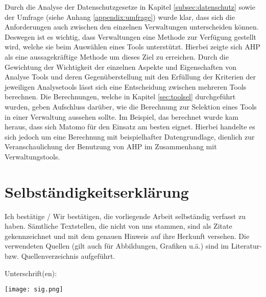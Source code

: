 Durch die Analyse der Datenschutzgesetze in Kapitel \ref{subsec:datenschutz} sowie der Umfrage (siehe Anhang \ref{appendix:umfrage}) wurde klar, dass sich die Anforderungen auch zwischen den einzelnen Verwaltungen unterscheiden können. Deswegen ist es wichtig, dass Verwaltungen eine Methode zur Verfügung gestellt wird, welche sie beim Auswählen eines Tools unterstützt. Hierbei zeigte sich AHP als eine aussagekräftige Methode um dieses Ziel zu erreichen. Durch die Gewichtung der Wichtigkeit der einzelnen Aspekte und Eigenschaften von Analyse Tools und deren Gegenüberstellung mit den Erfüllung der Kriterien der jeweiligen Analysetools lässt sich eine Entscheidung zwischen mehreren Tools berechnen. Die Berechnungen, welche in Kapitel \ref{sec:toolsel} durchgeführt wurden, geben Aufschluss darüber, wie die Berechnung zur Selektion eines Tools in einer Verwaltung aussehen sollte. Im Beispiel, das berechnet wurde kam heraus, dass sich Matomo für den Einsatz am besten eignet. Hierbei handelte es sich jedoch um eine Berechnung mit beispielhafter Datengrundlage, dienlich zur Veranschaulichung der Benutzung von AHP im Zusammenhang mit Verwaltungstools. 


\chapter{Selbständigkeitserklärung}

Ich bestätige / Wir bestätigen, die vorliegende Arbeit selbständig verfasst zu haben. Sämtliche Textstellen, die nicht von uns stammen, sind als Zitate gekennzeichnet und mit dem genauen Hinweis auf ihre Herkunft versehen. Die verwendeten Quellen (gilt auch für Abbildungen, Grafiken u.ä.) sind im Literatur- bzw. Quellenverzeichnis aufgeführt.



Unterschrift(en):

\texttt{[image: sig.png]}